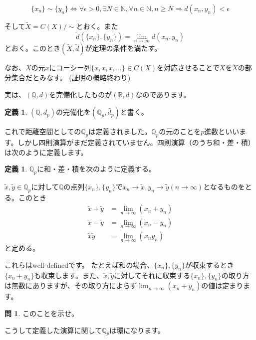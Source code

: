 \documentclass[uplatex]{jsarticle}
\newcommand{\Q}{\mathbb{Q}}
\newcommand{\R}{\mathbb{R}}
\theoremstyle{definition} %
\newtheorem{defi}[thm]{定義}
\newtheorem*{exercise*}{問}
\begin{document}
\[\{x_n\} \sim \{y_n\} \iff \forall \epsilon > 0, \exists N \in \mathbb{N}, \forall n \in \mathbb{N}, n \geq N \Rightarrow d(x_n, y_n) < \epsilon\]

そして$\tilde{X} = C(X)/{\sim}$とおく。また
\[\tilde{d}(\{x_n\}, \{y_n\}) = \lim_{n\to\infty} d(x_n, y_n)\]
とおく。このとき$(\tilde{X}, \tilde{d})$が定理の条件を満たす。 

なお、$X$の元$x$にコーシー列$\{x, x, x, \dots\} \in C(X)$を対応させることで$X$を$\tilde{X}$の部分集合だとみなす。 (証明の概略終わり)

実は、$(\Q, d)$を完備化したものが$(\R, d)$なのであります。

\begin{oframed}\begin{defi}
$(\Q, d_p)$の完備化を$(\Q_p, \tilde{d_p})$と書く。
\end{defi}\end{oframed}

これで距離空間としての$\Q_p$は定義されました。$\Q_p$の元のことを$p$進数といいます。しかし四則演算がまだ定義されていません。四則演算（のうち和・差・積）は次のように定義します。

\begin{oframed}\begin{defi}
$\Q_p$に和・差・積を次のように定義する。

$\tilde{x}, \tilde{y} \in \Q_p$に対して$\Q$の点列$\{x_n\}, \{y_n\}$で$x_n \to \tilde{x}, y_n \to \tilde{y} (n \to \infty)$となるものをとる。このとき
\begin{align*}
\tilde{x} + \tilde{y} &= \lim_{n\to\infty} (x_n + y_n) \\
\tilde{x} - \tilde{y} &= \lim_{n\to\infty} (x_n - y_n) \\
\tilde{x} \tilde{y} &= \lim_{n\to\infty} (x_n y_n)
\end{align*}
と定める。
\end{defi}\end{oframed}

これらはwell-definedです。
たとえば和の場合、$\{x_n\}, \{y_n\}$が収束するとき$\{x_n + y_n\}$も収束します。また、$\tilde{x}, \tilde{y}$に対してそれに収束する$\{x_n\}, \{y_n\}$の取り方は無数にありますが、その取り方によらず$\lim_{n\to\infty} (x_n + y_n)$の値は定まります。

\begin{exercise*}
このことを示せ。
\end{exercise*}


こうして定義した演算に関して$\Q_p$は環になります。
\end{document}
